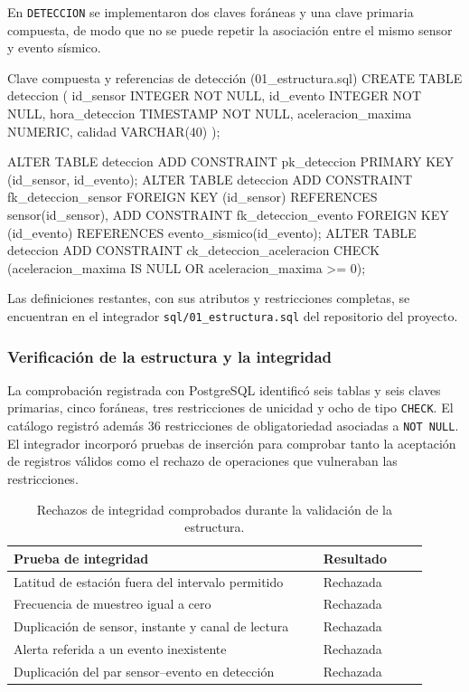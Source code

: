 \documentclass[12pt,a4paper]{article}
\begin{document}
En \texttt{DETECCION} se implementaron dos claves foráneas y una clave
 primaria compuesta, de modo que no se puede repetir la asociación
 entre el mismo sensor y evento sísmico.

\begin{sqlbloque}{Clave compuesta y referencias de detección (01\_estructura.sql)}
CREATE TABLE deteccion (
    id_sensor INTEGER NOT NULL,
    id_evento INTEGER NOT NULL,
    hora_deteccion TIMESTAMP NOT NULL,
    aceleracion_maxima NUMERIC,
    calidad VARCHAR(40)
);

ALTER TABLE deteccion
    ADD CONSTRAINT pk_deteccion PRIMARY KEY (id_sensor, id_evento);
ALTER TABLE deteccion
    ADD CONSTRAINT fk_deteccion_sensor
    FOREIGN KEY (id_sensor) REFERENCES sensor(id_sensor),
    ADD CONSTRAINT fk_deteccion_evento
    FOREIGN KEY (id_evento) REFERENCES evento_sismico(id_evento);
ALTER TABLE deteccion
    ADD CONSTRAINT ck_deteccion_aceleracion
    CHECK (aceleracion_maxima IS NULL OR aceleracion_maxima >= 0);
\end{sqlbloque}

Las definiciones restantes, con sus atributos y restricciones completas,
 se encuentran en el integrador \texttt{sql/01\_estructura.sql} del
 repositorio del proyecto.

\subsubsection*{Verificación de la estructura y la integridad}

La comprobación registrada con PostgreSQL identificó seis tablas y
 seis claves primarias, cinco foráneas, tres restricciones de unicidad
 y ocho de tipo \texttt{CHECK}. El catálogo registró además 36
 restricciones de obligatoriedad asociadas a \texttt{NOT NULL}.
 El integrador incorporó pruebas de inserción para comprobar tanto
 la aceptación de registros válidos como el rechazo de operaciones
 que vulneraban las restricciones.

\begin{table}[H]
\centering
\small
\begin{tabular}{@{}p{0.68\linewidth}p{0.23\linewidth}@{}}
\toprule
\textbf{Prueba de integridad} & \textbf{Resultado} \\
\midrule
Latitud de estación fuera del intervalo permitido & Rechazada \\
Frecuencia de muestreo igual a cero & Rechazada \\
Duplicación de sensor, instante y canal de lectura & Rechazada \\
Alerta referida a un evento inexistente & Rechazada \\
Duplicación del par sensor--evento en detección & Rechazada \\
\bottomrule
\end{tabular}
\caption{Rechazos de integridad comprobados durante la validación de la estructura.}
\label{tab:estructura-pruebas-41}
\end{table}
\end{document}
